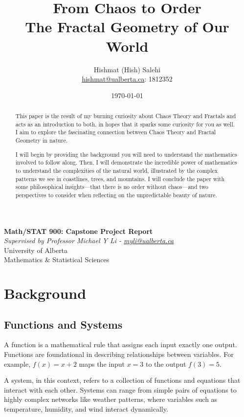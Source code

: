 \documentclass[12pt]{article}
\title{From Chaos to Order\\
       \large The Fractal Geometry of Our World}
\author{Hishmat (Hish) Salehi \\
\href{mailto:hishmat@ualberta.ca}{hishmat@ualberta.ca}: 1812352}
\date{\today}
\begin{document}
\maketitle

\begin{center}
\textbf{Math/STAT 900: Capstone Project Report}  \\
\emph{Supervised by Professor Michael Y Li - 
\href{mailto:myli@ualberta.ca}{myli@ualberta.ca}}  \\
University of Alberta \\
Mathematics \& Statistical Sciences
\end{center}

\begin{abstract}
This paper is the result of my burning curiosity about Chaos Theory and Fractals and acts as an introduction to both, in hopes that it sparks some curiosity for you as well. I aim to explore the fascinating connection between Chaos Theory and Fractal Geometry in nature. 

I will begin by providing the background you will need to understand the mathematics involved to follow along. Then, I will demonstrate the incredible power of mathematics to understand the complexities of the natural world, illustrated by the complex patterns we see in coastlines, trees, and mountains. I will conclude the paper with some philosophical insights—that there is no order without chaos—and two perspectives to consider when reflecting on the unpredictable beauty of nature.
\end{abstract}

\newpage

\tableofcontents

\section{Background}


\subsection{Functions and Systems}
A function is a mathematical rule that assigns each input exactly one output. Functions are foundational in describing relationships between variables. For example, \( f(x) = x + 2 \) maps the input \( x = 3 \) to the output \( f(3) = 5 \).

A system, in this context, refers to a collection of functions and equations that interact with each other. Systems can range from simple pairs of equations to highly complex networks like weather patterns, where variables such as temperature, humidity, and wind interact dynamically.
\end{document}

